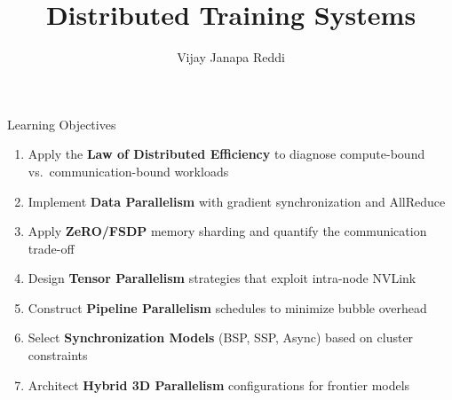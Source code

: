 \documentclass[aspectratio=169, 12pt]{beamer}
\title{Distributed Training Systems}
\author{Vijay Janapa Reddi}
\institute{Harvard University}
\date{}
\begin{document}

\begin{frame}{Learning Objectives}

\small
\begin{enumerate}
  \item Apply the \textbf{Law of Distributed Efficiency} to diagnose compute-bound vs.\ communication-bound workloads
  \item Implement \textbf{Data Parallelism} with gradient synchronization and AllReduce
  \item Apply \textbf{ZeRO/FSDP} memory sharding and quantify the communication trade-off
  \item Design \textbf{Tensor Parallelism} strategies that exploit intra-node NVLink
  \item Construct \textbf{Pipeline Parallelism} schedules to minimize bubble overhead
  \item Select \textbf{Synchronization Models} (BSP, SSP, Async) based on cluster constraints
  \item Architect \textbf{Hybrid 3D Parallelism} configurations for frontier models
\end{enumerate}

\end{frame}
\end{document}
